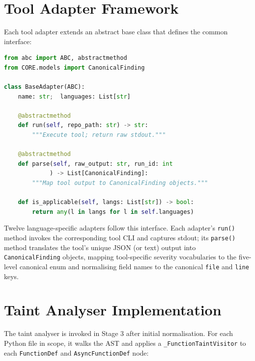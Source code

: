 \section{Tool Adapter Framework}
\label{sec:adapters}

Each tool adapter extends an abstract base class that defines the common interface:

\begin{samepage}
\begin{lstlisting}[language=Python, basicstyle=\footnotesize\ttfamily, caption={Abstract Tool Adapter Base Class}]
from abc import ABC, abstractmethod
from CORE.models import CanonicalFinding

class BaseAdapter(ABC):
    name: str;  languages: List[str]

    @abstractmethod
    def run(self, repo_path: str) -> str:
        """Execute tool; return raw stdout."""

    @abstractmethod
    def parse(self, raw_output: str, run_id: int
             ) -> List[CanonicalFinding]:
        """Map tool output to CanonicalFinding objects."""

    def is_applicable(self, langs: List[str]) -> bool:
        return any(l in langs for l in self.languages)
\end{lstlisting}
\end{samepage}

Twelve language-specific adapters follow this interface. Each adapter's \texttt{run()} method invokes the corresponding tool CLI and captures stdout; its \texttt{parse()} method translates the tool's unique JSON (or text) output into \texttt{CanonicalFinding} objects, mapping tool-specific severity vocabularies to the five-level canonical enum and normalising field names to the canonical \texttt{file} and \texttt{line} keys.

\section{Taint Analyser Implementation}
\label{sec:taint_impl}

The taint analyser is invoked in Stage 3 after initial normalisation. For each Python file in scope, it walks the AST and applies a \texttt{\_FunctionTaintVisitor} to each \texttt{FunctionDef} and \texttt{AsyncFunctionDef} node:


